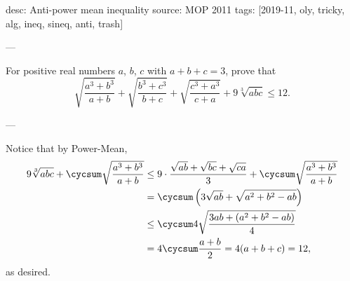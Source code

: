 desc: Anti-power mean inequality
source: MOP 2011
tags: [2019-11, oly, tricky, alg, ineq, sineq, anti, trash]

---

For positive real numbers $a$, $b$, $c$ with $a+b+c=3$, prove that \[\sqrt{\frac{a^3+b^3}{a+b}}+\sqrt{\frac{b^3+c^3}{b+c}}+\sqrt{\frac{c^3+a^3}{c+a}}+9\sqrt[3]{abc}\le12.\]

---

Notice that by Power-Mean,
\begin{align*}
    9\sqrt[3]{abc}+\cycsum\sqrt{\frac{a^3+b^3}{a+b}}&\le9\cdot\frac{\sqrt{ab}+\sqrt{bc}+\sqrt{ca}}3+\cycsum\sqrt{\frac{a^3+b^3}{a+b}}\\
    &=\cycsum\left(3\sqrt{ab}+\sqrt{a^2+b^2-ab}\right)\\
    &\le\cycsum4\sqrt{\frac{3ab+\left(a^2+b^2-ab\right)}4}\\
    &=4\cycsum\frac{a+b}2=4(a+b+c)=12,
\end{align*}
as desired.
